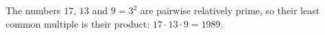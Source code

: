 The numbers $17$, $13$ and $9=3^2$ are pairwise relatively prime, so their least common multiple is their product: $17\cdot13\cdot9=\boxed{1989}$.
